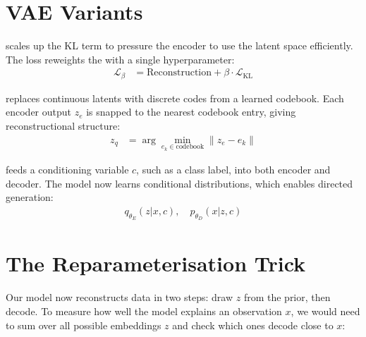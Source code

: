 




\vspace{1.5em}
\section{VAE Variants}

\cite{Higgins2017} scales up the KL term to pressure the encoder to use the latent space efficiently.
The loss reweights the with a single hyperparameter:
\begin{align*}
    \mathcal{L}_\beta &= \text{Reconstruction} + \beta \cdot \mathcal{L}_{\text{KL}}
\end{align*}

\vspace{1.0em}
\cite{vanDenOord2017} replaces continuous latents with discrete codes from a learned codebook.
Each encoder output $z_e$ is snapped to the nearest codebook entry, giving reconstructional structure:
\begin{align*}
    z_q &= \arg\min_{e_k \in \text{codebook}} \|z_e - e_k\|
\end{align*}

\vspace{1.0em}
\cite{Sohn2015} feeds a conditioning variable $c$, such as a class label, into both encoder and decoder.
The model now learns conditional distributions, which enables directed generation:
\begin{align*}
    q_{\theta_E}(z|x, c), \quad p_{\theta_D}(x|z, c)
\end{align*}









\newpage

\section{The Reparameterisation Trick}

Our model now reconstructs data in two steps: draw $z$ from the prior, then decode.
To measure how well the model explains an observation $x$, we would need to sum over all possible 
embeddings $z$ and check which ones decode close to $x$:

